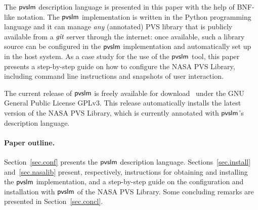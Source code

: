 The $\textsf{pvslm}$ description language is presented in this paper with the
help of BNF-like notation. The $\textsf{pvslm}$ implementation is written in
the Python programming language and it can manage {\em any}
(annotated) PVS library that is publicly available from a $\textit{git}$
server through the internet: once available, such a library source can
be configured in the $\textsf{pvslm}$ implementation and automatically set up
in the host system. As a case study for the use of the $\textsf{pvslm}$ tool,
this paper presents a step-by-step guide on how to configure the NASA
PVS Library, including command line instructions and snapshots of user
interaction.

The current release of $\textsf{pvslm}$ is freely available for
download~\cite{pvslm} under the GNU General Public License GPLv3. This
release automatically installs the latest version of the NASA PVS
Library, which is currently annotated with $\textsf{pvslm}$'s description
language.

\paragraph{Paper outline.} Section~\ref{sec.conf} presents
the $\textsf{pvslm}$ description language. Sections~\ref{sec.install}
and~\ref{sec.nasalib} present, respectively, instructions for
obtaining and installing the $\textsf{pvslm}$ implementation, and a
step-by-step guide on the configuration and installation with $\textsf{pvslm}$
of the NASA PVS Library. Some concluding remarks are presented in
Section~\ref{sec.concl}.
